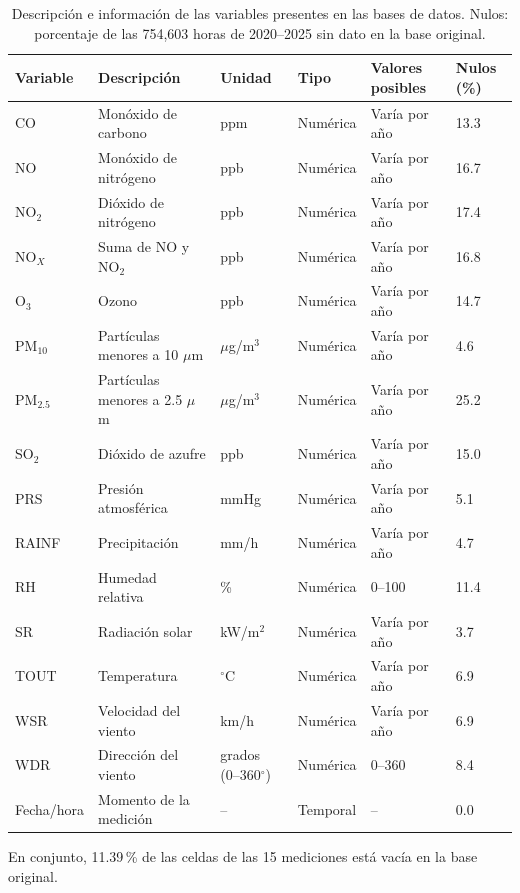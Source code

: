\documentclass[11pt,letterpaper]{article}
\newcommand{\ugm}{$\mu$g/m$^{3}$}
\begin{document}
\begin{table}[h]
\centering
\small
\renewcommand{\arraystretch}{1.1}
\begin{tabular}{@{}p{1.5cm}p{4.3cm}p{1.9cm}p{1.8cm}p{2.5cm}p{1.7cm}@{}}
\toprule
Variable & Descripci\'on & Unidad & Tipo & Valores posibles & Nulos (\%) \\
\midrule
CO & Mon\'oxido de carbono & ppm & Num\'erica & Var\'ia por a\~no & 13.3 \\
NO & Mon\'oxido de nitr\'ogeno & ppb & Num\'erica & Var\'ia por a\~no & 16.7 \\
NO$_2$ & Di\'oxido de nitr\'ogeno & ppb & Num\'erica & Var\'ia por a\~no & 17.4 \\
NO$_X$ & Suma de NO y NO$_2$ & ppb & Num\'erica & Var\'ia por a\~no & 16.8 \\
O$_3$ & Ozono & ppb & Num\'erica & Var\'ia por a\~no & 14.7 \\
PM$_{10}$ & Part\'iculas menores a 10 $\mu$m & \ugm{} & Num\'erica & Var\'ia por a\~no & 4.6 \\
PM$_{2.5}$ & Part\'iculas menores a 2.5 $\mu$m & \ugm{} & Num\'erica & Var\'ia por a\~no & 25.2 \\
SO$_2$ & Di\'oxido de azufre & ppb & Num\'erica & Var\'ia por a\~no & 15.0 \\
PRS & Presi\'on atmosf\'erica & mmHg & Num\'erica & Var\'ia por a\~no & 5.1 \\
RAINF & Precipitaci\'on & mm/h & Num\'erica & Var\'ia por a\~no & 4.7 \\
RH & Humedad relativa & \% & Num\'erica & 0--100 & 11.4 \\
SR & Radiaci\'on solar & kW/m$^2$ & Num\'erica & Var\'ia por a\~no & 3.7 \\
TOUT & Temperatura & $^\circ$C & Num\'erica & Var\'ia por a\~no & 6.9 \\
WSR & Velocidad del viento & km/h & Num\'erica & Var\'ia por a\~no & 6.9 \\
WDR & Direcci\'on del viento & grados (0--360$^\circ$) & Num\'erica & 0--360 & 8.4 \\
Fecha/hora & Momento de la medici\'on & -- & Temporal & -- & 0.0 \\
\bottomrule
\end{tabular}
\caption{Descripci\'on e informaci\'on de las variables presentes en las bases de datos. Nulos: porcentaje de las 754,603 horas de 2020--2025 sin dato en la base original.}
\label{tab:variables}
\end{table}
En conjunto, 11.39\,\% de las celdas de las 15 mediciones est\'a vac\'ia en la base original.
\end{document}
